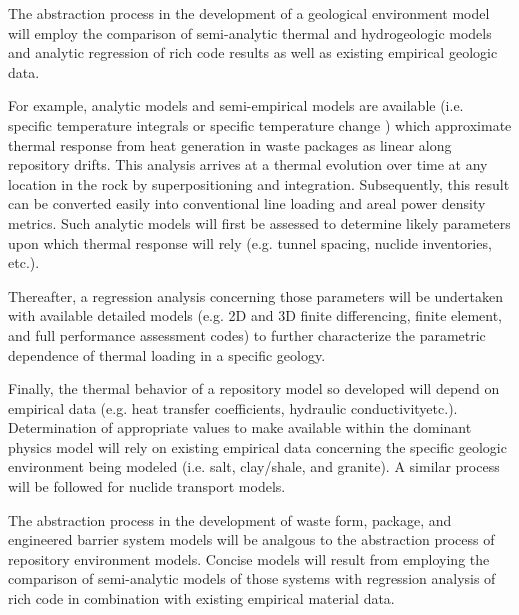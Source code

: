 The abstraction process in the development of a geological environment 
model will employ the comparison of semi-analytic thermal and 
hydrogeologic models and analytic regression of rich code results as 
well as existing empirical geologic data.  

For example, analytic models and semi-empirical models are available 
(i.e. specific temperature integrals \cite{li_methodology_2006} or 
specific temperature change \cite{radel_effect_2007}) which 
approximate thermal response from heat generation in waste packages as 
linear along repository drifts. This analysis arrives at a thermal 
evolution over time at any location in the rock by superpositioning 
and integration. Subsequently, this result can be converted easily 
into conventional line loading and areal power density metrics.  Such 
analytic models will first be assessed to determine likely parameters 
upon which thermal response will rely (e.g. tunnel spacing, nuclide 
inventories, etc.).

Thereafter, a regression analysis concerning those parameters will be 
undertaken with available detailed models (e.g. 2D and 3D finite 
differencing, finite element, and full performance assessment codes) 
to further characterize the parametric dependence of thermal loading 
in a specific geology.  

Finally, the thermal behavior of a repository model so developed will 
depend on empirical data (e.g.  heat transfer coefficients, hydraulic 
conductivityetc.). Determination of appropriate values to make 
available within the dominant physics model will rely on existing 
empirical data concerning the specific geologic environment being 
modeled (i.e. salt, clay/shale, and granite). A similar process will 
be followed for nuclide transport models.

The abstraction process in the development of waste form, package, and 
engineered barrier system models will be analgous to the abstraction 
process of repository environment models. Concise models will result 
from employing the comparison of semi-analytic models of those systems 
with regression analysis of rich code in combination with existing 
empirical material data.

